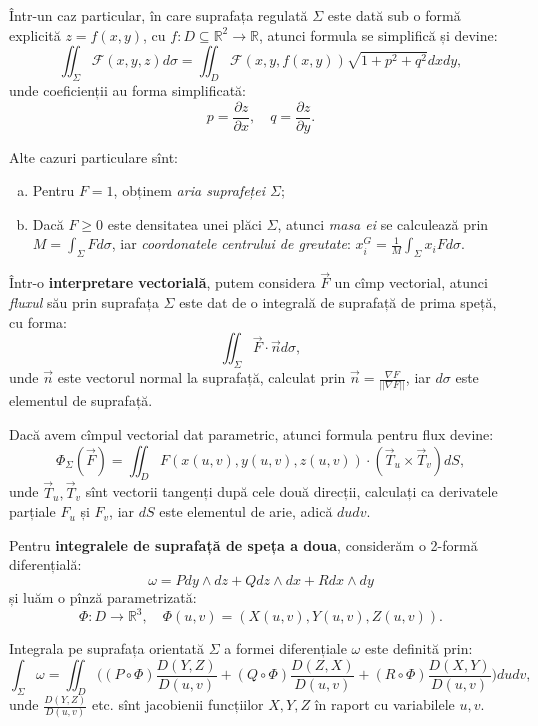\documentclass[11pt,a4paper]{article}
\newcommand\seq{\subseteq}
\newcommand\RR{\mathbb{R}}
\theoremstyle{dotless}
\theoremstyle{dotlessdr}
\begin{document}
Într-un caz particular, în care suprafața regulată $\Sigma$ este dată sub o formă
explicită $z = f(x, y)$, cu $f : D \seq \RR^2 \to \RR$, atunci formula se simplifică
și devine:
\[
  \iint_\Sigma \mathcal{F}(x, y, z) d \sigma =
  \iint_D \mathcal{F}(x, y, f(x, y)) \sqrt{1 + p^2 + q^2} dx dy,
\]
unde coeficienții au forma simplificată:
\[
  p = \frac{\partial z}{\partial x}, \quad q = \frac{\partial z}{\partial y}.
\]

Alte cazuri particulare sînt:
\begin{enumerate}[(a)]
\item Pentru $F = 1$, obținem \emph{aria suprafeței $\Sigma$};
\item Dacă $F \geq 0$ este densitatea unei plăci $\Sigma$, atunci \emph{masa ei}
  se calculează prin $M = \int_\Sigma F d \sigma$, iar \emph{coordonatele centrului %
  de greutate}: $x_i^G = \frac{1}{M} \int_\Sigma x_i F d \sigma$.
\end{enumerate}

Într-o \textbf{interpretare vectorială}, putem considera $\vec{F}$ un cîmp vectorial,
atunci \emph{fluxul} său prin suprafața $\Sigma$ este dat de o integrală de suprafață
de prima speță, cu forma:
\[
  \iint_\Sigma \vec{F} \cdot \vec{n} d \sigma,
\]
unde $\vec{n}$ este vectorul normal la suprafață, calculat prin
$\vec{n} = \frac{\nabla F}{||\nabla F||}$, iar $d \sigma$ este elementul de suprafață.

Dacă avem cîmpul vectorial dat parametric, atunci formula pentru flux devine:
\[
  \Phi_\Sigma (\vec{F}) = \iint_D F(x(u, v), y(u, v), z(u, v)) \cdot
  (\vec{T}_u \times \vec{T}_v) dS,
\]
unde $\vec{T}_u, \vec{T}_v$ sînt vectorii tangenți după cele două direcții, calculați
ca derivatele parțiale $F_u$ și $F_v$, iar $dS$ este elementul de arie, adică $dudv$.

\vspace{1cm}

Pentru \textbf{integralele de suprafață de speța a doua}, considerăm o 2-formă
diferențială:
\[
  \omega = P dy \wedge dz + Q dz \wedge dx + R dx \wedge dy
\]
și luăm o pînză parametrizată:
\[
  \Phi : D \to \RR^3, \quad \Phi(u, v) = (X(u, v), Y(u, v), Z(u, v)).
\]

Integrala pe suprafața orientată $\Sigma$ a formei diferențiale $\omega$ este
definită prin:
\[
  \int_\Sigma \omega = \iint_D \Big( (P \circ \Phi) \frac{D(Y,Z)}{D(u, v)} +
  (Q \circ \Phi) \frac{D(Z, X)}{D(u,v)} + (R \circ \Phi) \frac{D(X, Y)}{D(u,v)}\Big)dudv,
\]
unde $\frac{D(Y,Z)}{D(u,v)}$ etc. sînt jacobienii funcțiilor $X, Y, Z$ în raport cu
variabilele $u, v$.
\end{document}
